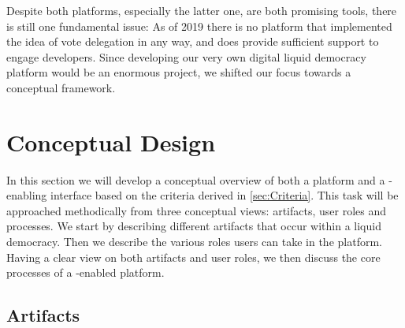 Despite both platforms, especially the latter one, are both promising tools, there is still one fundamental issue: As of 2019 there is no  platform that implemented the idea of vote delegation in any way, and does provide sufficient support to engage developers. Since developing our very own digital liquid democracy platform would be an enormous project, we shifted our focus towards a conceptual framework.





\section{Conceptual Design}
\label{sec:Conceptual_Approach}
In this section we will develop a conceptual overview of both a  platform and a -enabling interface based on the criteria derived in \ref{sec:Criteria}.
This task will be approached methodically from three conceptual views: artifacts, user roles and processes.
We start by describing different artifacts that occur within a liquid democracy.
Then we describe the various roles users can take in the platform.
Having a clear view on both artifacts and user roles, we then discuss the core processes of a -enabled  platform.

\subsection{Artifacts}
\label{ssec:data_fragments}


